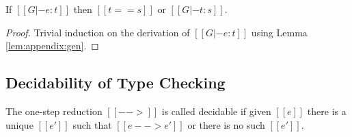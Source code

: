\begin{lem}\label{lem:appendix:corrtyp}
    If $[[G |- e:t]]$ then $[[t == s]]$ or $[[G |- t : s]]$.
\end{lem}

\begin{proof}
    Trivial induction on the derivation of $[[G |- e:t]]$ using Lemma
\ref{lem:appendix:gen}.
\end{proof}

\subsection{Decidability of Type Checking}
\begin{lem}\label{lem:appendix:unired}
	The one-step reduction $[[-->]]$ is called decidable if 
given $[[e]]$ there is a unique $[[e']]$ such that $[[e --> e']]$ or there is no such $[[e']]$.
\end{lem}

